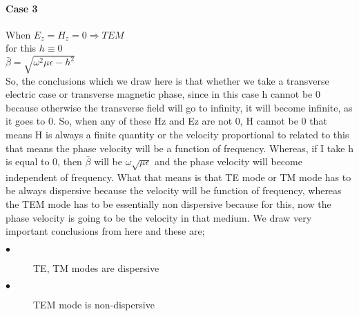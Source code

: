 \paragraph{Case 3}When $E_z = H_z = 0 \Rightarrow TEM$\\
for this $h \equiv 0$\\
$\bar{\beta} = \sqrt{\omega^2\mu\epsilon - h^2}$ \\
So, the conclusions which we draw here is that whether we take a transverse electric case or transverse magnetic phase, since in this case h cannot be 0 because otherwise the transverse field will go to infinity, it will become infinite, as it goes to 0. So, when any of these Hz and Ez are not 0, H cannot be 0 that means H is always a finite quantity or the velocity proportional to related to this that means the phase velocity will be a function of frequency. Whereas, if I take h is equal to 0, then $\bar{\beta}$ will be $\omega \sqrt{\mu\epsilon}$ and the phase velocity will become independent of frequency. What that means is that TE mode or TM mode has to be always dispersive because the velocity will be function of frequency, whereas the TEM mode has to be essentially non dispersive because for this, now the phase velocity is going to be the velocity in that medium. We draw very important conclusions from here and these are;\\
\begin{description}
	\item[$ \bullet $] TE, TM modes are dispersive
	\item[$ \bullet $] TEM mode is non-dispersive
\end{description}

